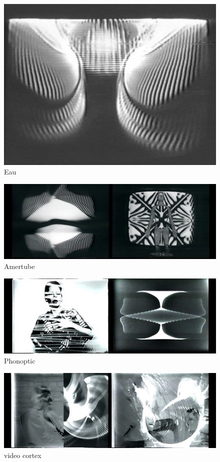 \documentclass[
]{book}
\begin{document}
\begin{figure}
\centering
\includegraphics{medias/corpus/boyer/Eau.jpg}
\caption{Eau}
\end{figure}

\begin{figure}
\centering
\includegraphics{medias/corpus/boyer/L-Amertube-2f5ae.jpg}
\caption{Amertube}
\end{figure}

\begin{figure}
\centering
\includegraphics{medias/corpus/boyer/Phonoptic-33bd2.jpg}
\caption{Phonoptic}
\end{figure}

\begin{figure}
\centering
\includegraphics{medias/corpus/boyer/Video-Cortex-b8d37.jpg}
\caption{video cortex}
\end{figure}
\end{document}
